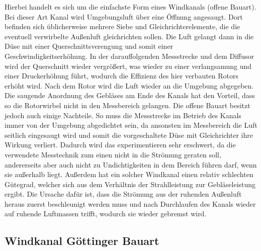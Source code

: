 \documentclass[a4paper,10pt]{scrartcl}
\begin{document}
		Hierbei handelt es sich um die einfachste Form eines Windkanals (offene Bauart). Bei dieser Art Kanal wird Umgebungsluft über eine Öffnung angesaugt.
		Dort befinden sich üblicherweise mehrere Siebe und Gleichrichterelemente, die die eventuell verwirbelte Außenluft gleichrichten sollen.
		Die Luft gelangt dann in die Düse mit einer Querschnittsverengung und somit einer Geschwindigkeitserhöhung. In der darauffolgenden Messstrecke und dem Diffusor wird der Querschnitt wieder vergrößert, was wieder zu einer verlangsamung und einer Druckerhöhung führt, wodurch die Effizienz des hier verbauten Rotors erhöht wird. Nach dem Rotor wird die Luft wieder an die Umgebung
		abgegeben. Die saugende Anordnung des Gebläses am Ende des Kanals hat den Vorteil, dass so die
		Rotorwirbel nicht in den Messbereich gelangen. Die
		offene Bauart besitzt jedoch auch einige Nachteile. So muss die Messstrecke im Betrieb des Kanals
		immer von der Umgebung abgedichtet sein, da ansonsten im Messbereich die Luft seitlich
		eingesaugt wird und somit die vorgeschaltete Düse mit Gleichrichter ihre Wirkung verliert. Dadurch wird das experimentieren sehr erschwert, da die verwendete Messtechnik zum einen nicht in
		die Strömung geraten soll, andererseits aber auch nicht zu Undichtigkeiten in dem Bereich führen darf,
		wenn sie außerhalb liegt. Außerdem hat ein solcher Windkanal einen relativ schlechten Gütegrad, welcher
		sich aus dem Verhältnis der Strahlleistung zur Gebläseleistung ergibt. Die Ursache dafür ist, dass die Strömung aus der ruhenden Außenluft heraus zuerst beschleunigt werden muss und nach
		Durchlaufen des Kanals wieder auf ruhende Luftmassen trifft, wodurch sie wieder gebremst wird.
		
		\subsection{Windkanal Göttinger Bauart}
		
\end{document}
